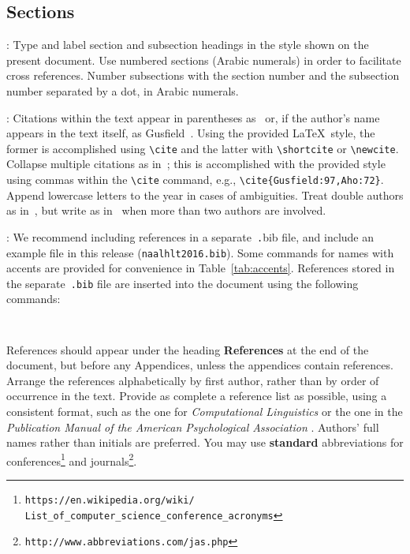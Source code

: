\documentclass[11pt,letterpaper]{article}
\newcommand\BibTeX{B{\sc ib}\TeX}
\begin{document}
\subsection{Sections}

: Type and label section and subsection headings in
the style shown on the present document.  Use numbered sections (Arabic
numerals) in order to facilitate cross references. Number subsections
with the section number and the subsection number separated by a dot,
in Arabic numerals. 

: Citations within the text appear in parentheses
as~\cite{Gusfield:97} or, if the author's name appears in the text itself,
as Gusfield~.  Using the provided \LaTeX\ style, the
former is accomplished using {\small\verb|\cite|} and the latter with
{\small\verb|\shortcite|} or {\small\verb|\newcite|}.  Collapse multiple
citations as in~\cite{Gusfield:97,Aho:72}; this is accomplished with the
provided style using commas within the {\small\verb|\cite|} command, e.g.,
{\small\verb|\cite{Gusfield:97,Aho:72}|}. Append lowercase letters to the
year in cases of ambiguities. Treat double authors as in~\cite{Aho:72}, but
write as in~\cite{Chandra:81} when more than two authors are involved.  

:  We recommend
including references in a separate~{\small\texttt .bib} file, and include
an example file in this release ({\small\tt naalhlt2016.bib}). Some commands
for names with accents are provided for convenience in
Table~\ref{tab:accents}. References stored in the separate~{\small\tt .bib}
file are inserted into the document using the following commands:

\small
\begin{verbatim}


\end{verbatim}
\normalsize 

References should appear under the heading {\bf References} at the end of
the document, but before any Appendices, unless the appendices contain
references. Arrange the references alphabetically by first author, rather
than by order of occurrence in the text.
Provide as complete a reference list as possible, using a consistent format,
such as the one for {\em Computational Linguistics\/} or the one in the 
{\em Publication Manual of the American Psychological Association\/}
\cite{APA:83}. Authors' full names rather than initials are preferred. You
may use {\bf standard} abbreviations for conferences\footnote{\scriptsize {\tt https://en.wikipedia.org/wiki/ \\ \-\hspace{.75cm} List\_of\_computer\_science\_conference\_acronyms}}
and journals\footnote{\tt http://www.abbreviations.com/jas.php}.
\end{document}
